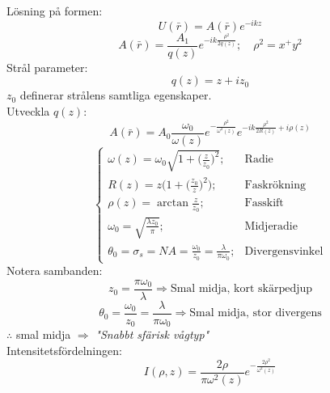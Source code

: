 \documentclass{article}
\begin{document}
    Lösning på formen:
    \[
      U(\bar{r})=A(\bar{r})e^{-ikz}
    \]
    \[
      A(\bar{r})=\frac{A_1}{q(z)}e^{-ik\frac{\rho^2}{2q(z)}};\quad\rho^2=x^+y^2
    \]
    Strål parameter:
    \[
      q(z)=z+iz_0
    \]
    $z_0$ definerar strålens samtliga egenskaper. \\

    Utveckla $q(z)$:
    \[
      A(\bar{r})=A_0\frac{\omega_0}{\omega(z)}e^{-\frac{\rho^2}{\omega^2(z)}}e^{-ik\frac{\rho^2}{2R(z)}+i\rho(z)}
    \]
    \[\begin{cases}
      \omega(z)=\omega_0\sqrt{1+\big(\frac{z}{z_0}\big)^2};&\text{Radie}\\
      R(z)=z\bigg(1+\big(\frac{z_0}{z}\big)^2\bigg);&\text{Faskrökning}\\
      \rho(z)=\arctan{\frac{z}{z_0}};&\text{Fasskift}\\
      \omega_0=\sqrt{\frac{\lambda z_0}{\pi}};&\text{Midjeradie}\\
      \theta_0=\sigma_s=NA=\frac{\omega_0}{z_0}=\frac{\lambda}{\pi\omega_0};&\text{Divergensvinkel}
    \end{cases}\]
    Notera sambanden:
    \[
      z_0=\frac{\pi\omega_0}{\lambda}\Rightarrow\text{Smal midja, kort skärpedjup}
    \]
    \[
      \theta_0=\frac{\omega_0}{z_0}=\frac{\lambda}{\pi\omega_0}\Rightarrow\text{Smal midja, stor divergens}
    \]
    $\therefore$ smal midja $\Rightarrow$ \textit{"Snabbt sfärisk vågtyp"}\\

    Intensitetsfördelningen:
    \[
      I(\rho,z)=\frac{2\rho}{\pi\omega^2(z)}e^{-\frac{2\rho^2}{\omega^2(z)}}
    \]
\end{document}
